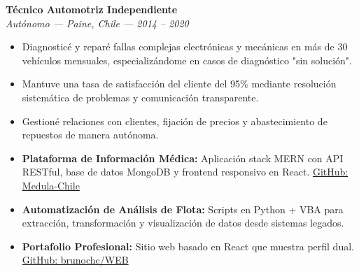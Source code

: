 \documentclass[10pt,letterpaper]{article}
\begin{document}
\vspace{0.2cm}

\noindent \textbf{Técnico Automotriz Independiente} \\
\textit{Autónomo — Paine, Chile — 2014 – 2020}
\begin{itemize}
    \item Diagnosticé y reparé fallas complejas electrónicas y mecánicas en más de 30 vehículos mensuales, especializándome en casos de diagnóstico "sin solución".
    \item Mantuve una tasa de satisfacción del cliente del 95\% mediante resolución sistemática de problemas y comunicación transparente.
    \item Gestioné relaciones con clientes, fijación de precios y abastecimiento de repuestos de manera autónoma.
\end{itemize}

\vspace{0.4cm}


\vspace{0.3cm}

\begin{itemize}
    \item \textbf{Plataforma de Información Médica:} Aplicación stack MERN con API RESTful, base de datos MongoDB y frontend responsivo en React. \href{https://github.com/Medula-Chile}{GitHub: Medula-Chile}
    \item \textbf{Automatización de Análisis de Flota:} Scripts en Python + VBA para extracción, transformación y visualización de datos desde sistemas legados.
    \item \textbf{Portafolio Profesional:} Sitio web basado en React que muestra perfil dual. \href{https://github.com/brunochc/WEB}{GitHub: brunochc/WEB}
\end{itemize}

\vspace{0.4cm}

\vspace{0.3cm}
\end{document}
